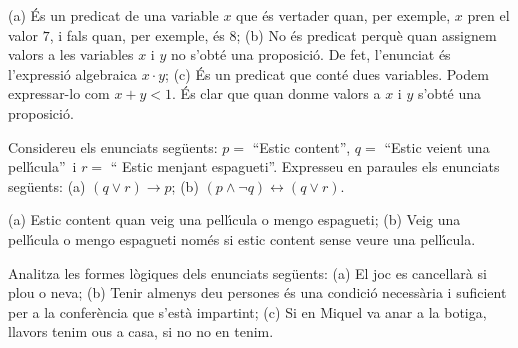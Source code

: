 \begin{solucio}
(a) \'{E}s un predicat de una variable $x$ que \'{e}s vertader quan, per
exemple, $x$ pren el valor $7$, i fals quan, per exemple, \'{e}s $8$; (b) No
\'{e}s predicat perqu\`{e} quan assignem valors a les variables $x$ i $y$ no
s'obt\'{e} una proposici\'{o}. De fet, l'enunciat \'{e}s l'expressi\'{o}
algebraica $x\cdot y$; (c) \'{E}s un predicat que cont\'{e} dues variables.
Podem expressar-lo com $x+y<1$. \'{E}s clar que quan donme valors a $x$ i $y$
s'obt\'{e} una proposici\'{o}.
\end{solucio}

\begin{exer}
Considereu els enunciats seg\"{u}ents: $p=$ \textquotedblleft Estic
content\textquotedblright, $q=$ \textquotedblleft Estic veient una
pel\textperiodcentered l\'{\i}cula\textquotedblright\ i $r=$ \textquotedblleft
Estic menjant espagueti\textquotedblright. Expresseu en paraules els enunciats
seg\"{u}ents: (a) $\left(  q\vee r\right)  \longrightarrow p$; (b) $\left(
p\wedge\lnot q\right)  \longleftrightarrow\left(  q\vee r\right)  $.
\end{exer}

\begin{solucio}
(a) Estic content quan veig una pel\textperiodcentered l\'{\i}cula o mengo
espagueti; (b) Veig una pel\textperiodcentered l\'{\i}cula o mengo espagueti
nom\'{e}s si estic content sense veure una pel\textperiodcentered l\'{\i}cula.
\end{solucio}

\begin{exer}
Analitza les formes l\`{o}giques dels enunciats seg\"{u}ents: (a) El joc es
cancel\textperiodcentered lar\`{a} si plou o neva; (b) Tenir almenys deu
persones \'{e}s una condici\'{o} necess\`{a}ria i suficient per a la
confer\`{e}ncia que s'est\`{a} impartint; (c) Si en Miquel va anar a la
botiga, llavors tenim ous a casa, si no no en tenim.
\end{exer}

